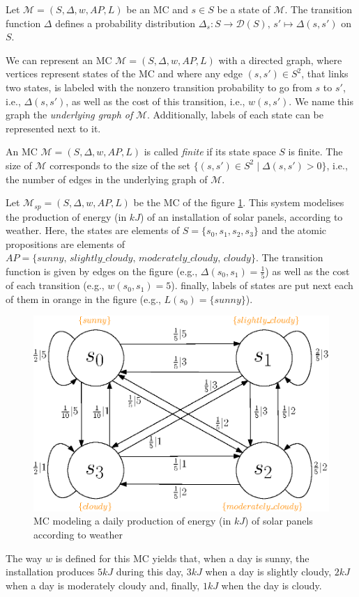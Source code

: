 \begin{property}
  Let $\mathcal{M} = (S, \Delta, w, AP, L)$ be an MC and $s \in S$ be a state of $\mathcal{M}$. The transition function $\Delta$ defines a probability distribution $\Delta_s: S \rightarrow \mathcal{D}(S), \, s' \mapsto \Delta(s, s')$ on $S$.
\end{property}

We can represent an MC $\mathcal{M} = (S, \Delta, w, AP, L)$ with a directed graph, where vertices represent states
of the MC and where any edge $(s, s') \in S^2$, that links two states, is labeled with the nonzero transition probability to go from $s$ to $s'$, i.e., $\Delta(s, s')$, as well as the cost of this transition, i.e., $w(s, s')$.
We name this graph the \textit{underlying graph of} $\mathcal{M}$.
Additionally, labels of each
state can be represented next to it.

\begin{notation}
  An MC $\mathcal{M}=(S, \Delta, w, AP, L)$ is called \textit{finite} if its state space $S$ is finite. The size of $\mathcal{M}$ corresponds to the size of the set
  $\{(s, s') \in S^2 \; | \; \Delta(s, s') > 0 \}$, i.e., the number of edges in the underlying graph of $\mathcal{M}$.
\end{notation}

\begin{example}\label{solar-panel}
  Let $\mathcal{M}_{sp} = (S, \Delta, w, AP, L)$ be the MC of the figure \ref{MCexample}. This system modelises the production of energy (in $kJ$) of
  an installation of solar panels, according to weather.
  Here, the states are elements of $S = \{s_0, s_1, s_2, s_3\}$ and the atomic propositions are elements of $AP = \{sunny, \, slightly\_cloudy, \, moderately\_cloudy, \, cloudy \}$. The transition function is given by edges on the figure (e.g., $\Delta(s_0, s_1) = \frac{1}{5}$) as well as the
  cost of each transition (e.g., $w(s_0, s_1) = 5$). finally, labels of states
  are put next each of them in orange in the figure (e.g., $L(s_0) = \{sunny\}$).
  \begin{figure}[h!]
    \centering
    \includegraphics[width=0.6\linewidth]{resources/weather-solar-pannel}
    \caption{MC modeling a daily production of energy (in $kJ$) of solar panels according to weather}
    \label{MCexample}
  \end{figure}
  The way $w$ is defined for this MC yields that, when a day is sunny, the installation produces $5 kJ$ during this day, $3 kJ$ when a day is slightly cloudy, $2 kJ$ when a day is moderately cloudy and, finally, $1 kJ$ when the day is cloudy.
\end{example}

